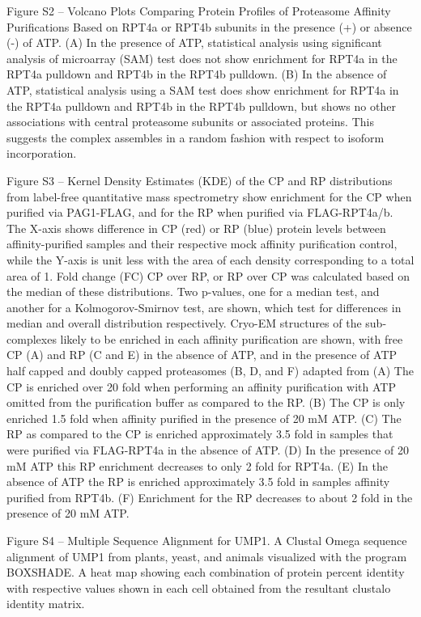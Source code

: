 Figure S2 – Volcano Plots Comparing Protein Profiles of Proteasome Affinity Purifications Based on RPT4a or RPT4b subunits in the presence (+) or absence (-) of ATP. (A) In the presence of ATP, statistical analysis using significant analysis of microarray (SAM) test does not show enrichment for RPT4a in the RPT4a pulldown and RPT4b in the RPT4b pulldown. (B) In the absence of ATP, statistical analysis using a SAM test does show enrichment for RPT4a in the RPT4a pulldown and RPT4b in the RPT4b pulldown, but shows no other associations with central proteasome subunits or associated proteins. This suggests the complex assembles in a random fashion with respect to isoform incorporation.

Figure S3 – Kernel Density Estimates (KDE) of the CP and RP distributions from label-free quantitative mass spectrometry show enrichment for the CP when purified via PAG1-FLAG, and for the RP when purified via FLAG-RPT4a/b. The X-axis shows difference in CP (red) or RP (blue) protein levels between affinity-purified samples and their respective mock affinity purification control, while the Y-axis is unit less with the area of each density corresponding to a total area of 1. Fold change (FC) CP over RP, or RP over CP was calculated based on the median of these distributions. Two p-values, one for a median test, and another for a Kolmogorov-Smirnov test, are shown, which test for differences in median and overall distribution respectively. Cryo-EM structures of the sub-complexes likely to be enriched in each affinity purification are shown, with free CP (A) and RP (C and E) in the absence of ATP, and in the presence of ATP half capped and doubly capped proteasomes (B, D, and F) adapted from \citep{beck12} (A) The CP is enriched over 20 fold when performing an affinity purification with ATP omitted from the purification buffer as compared to the RP. (B) The CP is only enriched 1.5 fold when affinity purified in the presence of 20 mM ATP. (C) The RP as compared to the CP is enriched approximately 3.5 fold in samples that were purified via FLAG-RPT4a in the absence of ATP. (D) In the presence of 20 mM ATP this RP enrichment decreases to only 2 fold for RPT4a. (E) In the absence of ATP the RP is enriched approximately 3.5 fold in samples affinity purified from RPT4b. (F) Enrichment for the RP decreases to about 2 fold in the presence of 20 mM ATP.


Figure S4 – Multiple Sequence Alignment for UMP1. A Clustal Omega \citep{sievers14} sequence alignment of UMP1 from plants, yeast, and animals visualized with the program BOXSHADE. A heat map showing each combination of protein percent identity with respective values shown in each cell obtained from the resultant clustalo identity matrix. 

